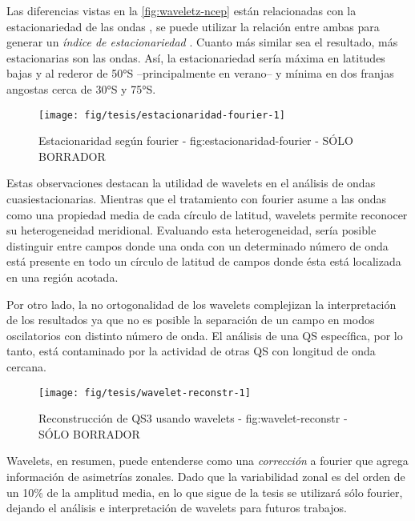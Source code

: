 \documentclass[spanish,a4paper]{book}
\begin{document}
Las diferencias vistas en la \autoref{fig:waveletz-ncep} están
relacionadas con la estacionariedad de las ondas
,
se puede utilizar la relación entre ambas para generar un \emph{índice
de estacionariedad} . Cuanto más
similar sea el resultado, más estacionarias son las ondas. Así, la
estacionariedad sería máxima en latitudes bajas y al rederor de 50°S
--principalmente en verano-- y mínima en dos franjas angostas cerca de
30°S y 75°S. 

\begin{figure*}
\texttt{[image: fig/tesis/estacionaridad-fourier-1]} \caption{Estacionaridad según fourier - fig:estacionaridad-fourier - SÓLO BORRADOR}\label{fig:estacionaridad-fourier}
\end{figure*}

Estas observaciones destacan la utilidad de wavelets en el análisis de
ondas cuasiestacionarias. Mientras que el tratamiento con fourier asume
a las ondas como una propiedad media de cada círculo de latitud,
wavelets permite reconocer su heterogeneidad meridional. Evaluando esta
heterogeneidad, sería posible distinguir entre campos donde una onda con
un determinado número de onda está presente en todo un círculo de
latitud de campos donde ésta está localizada en una región acotada.

Por otro lado, la no ortogonalidad de los wavelets complejizan la
interpretación de los resultados ya que no es posible la separación de
un campo en modos oscilatorios con distinto número de onda. El análisis
de una QS específica, por lo tanto, está contaminado por la actividad de
otras QS con longitud de onda cercana.

\begin{figure*}
\texttt{[image: fig/tesis/wavelet-reconstr-1]} \caption{Reconstrucción de QS3 usando wavelets - fig:wavelet-reconstr - SÓLO BORRADOR}\label{fig:wavelet-reconstr}
\end{figure*}

Wavelets, en resumen, puede entenderse como una \emph{corrección} a
fourier que agrega información de asimetrías zonales. Dado que la
variabilidad zonal es del orden de un 10\% de la amplitud media, en lo
que sigue de la tesis se utilizará sólo fourier, dejando el análisis e
interpretación de wavelets para futuros trabajos.
\end{document}
